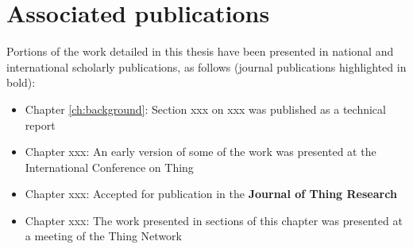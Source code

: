 \clearpage
\section{Associated publications}
\label{sec:publications}

Portions of the work detailed in this thesis have been presented in national and international scholarly publications, as follows (journal publications highlighted in bold):

\begin{itemize}

\item	
Chapter \ref{ch:background}:
Section xxx on xxx
was published as a technical report 

\item	
Chapter xxx:
An early version of some of the work was presented at the International Conference on Thing %

\item	
Chapter xxx:
Accepted for publication in the \textbf{Journal of Thing Research}

\item	
Chapter xxx:
The work presented in sections of this chapter was presented at a meeting of the Thing Network

\end{itemize}